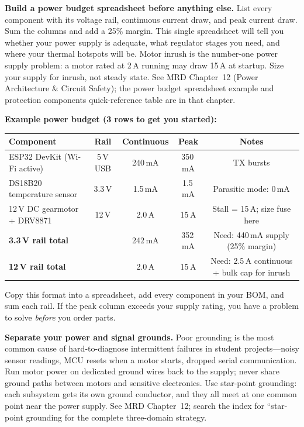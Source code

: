 \documentclass[11pt,letterpaper]{article}
\begin{document}
\begin{protip}
\textbf{Build a power budget spreadsheet before anything else.} List every component with its voltage rail, continuous current draw, and peak current draw. Sum the columns and add a 25\% margin. This single spreadsheet will tell you whether your power supply is adequate, what regulator stages you need, and where your thermal hotspots will be. Motor inrush is the number-one power supply problem: a motor rated at 2\,A running may draw 15\,A at startup. Size your supply for inrush, not steady state. See MRD Chapter~12 (Power Architecture \& Circuit Safety); the power budget spreadsheet example and protection components quick-reference table are in that chapter.

\vspace{4pt}
\textbf{Example power budget (3 rows to get you started):}

\begin{center}\small
\begin{tabularx}{0.95\textwidth}{l c c c c}
\toprule
\textbf{Component} & \textbf{Rail} & \textbf{Continuous} & \textbf{Peak} & \textbf{Notes} \\
\midrule
ESP32 DevKit (Wi-Fi active) & 5\,V USB & 240\,mA & 350\,mA & TX bursts \\
DS18B20 temperature sensor & 3.3\,V & 1.5\,mA & 1.5\,mA & Parasitic mode: 0\,mA \\
12\,V DC gearmotor + DRV8871 & 12\,V & 2.0\,A & 15\,A & Stall = 15\,A; size fuse here \\
\midrule
\textbf{3.3\,V rail total} & & 242\,mA & 352\,mA & Need: 440\,mA supply (25\% margin) \\
\textbf{12\,V rail total} & & 2.0\,A & 15\,A & Need: 2.5\,A continuous + bulk cap for inrush \\
\bottomrule
\end{tabularx}
\end{center}
\vspace{2pt}
\noindent Copy this format into a spreadsheet, add every component in your BOM, and sum each rail. If the peak column exceeds your supply rating, you have a problem to solve \textit{before} you order parts.
\end{protip}

\begin{warnbox}
\textbf{Separate your power and signal grounds.} Poor grounding is the most common cause of hard-to-diagnose intermittent failures in student projects---noisy sensor readings, MCU resets when a motor starts, dropped serial communication. Run motor power on dedicated ground wires back to the supply; never share ground paths between motors and sensitive electronics. Use star-point grounding: each subsystem gets its own ground conductor, and they all meet at one common point near the power supply. See MRD Chapter~12; search the index for ``star-point grounding for the complete three-domain strategy.
\end{warnbox}
\end{document}
